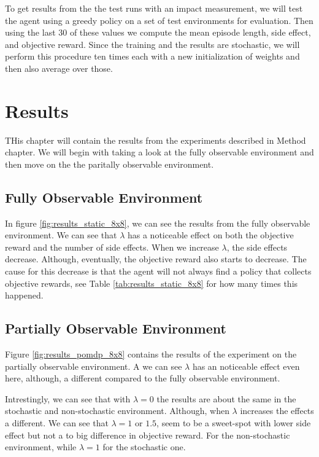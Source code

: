 \documentclass[12pt,A4]{report}
\theoremstyle{definition}
\begin{document}
To get results from the the test runs with an impact measurement, we will test the agent using a greedy policy on a set of test environments for evaluation. Then using the last 30 of these values we compute the mean episode length, side effect, and objective reward. Since the training and the results are stochastic, we will perform this procedure ten times each with a new initialization of weights and then also average over those.



\chapter{Results}
THis chapter will contain the results from the experiments described in Method chapter. We will begin with taking a look at the fully observable environment and then move on the the paritally observable environment.

\section{Fully Observable Environment}
In figure \ref{fig:results_static_8x8}, we can see the results from the fully observable environment. We can see that $\lambda$ has a noticeable effect on both the objective reward and the number of side effects. When we increase $\lambda$, the side effects decrease. Although, eventually,  the objective reward also starts to decrease. The cause for this decrease is that the agent will not always find a policy that collects objective rewards, see Table \ref{tab:results_static_8x8} for how many times this happened. 

\section{Partially Observable Environment}
Figure \ref{fig:results_pomdp_8x8} contains the results of the experiment on the partially observable environment. A we can see $\lambda$ has an noticeable effect even here, although, a different compared to the fully observable environment.

Intrestingly, we can see that with $\lambda=0$ the results are about the same in the stochastic and non-stochastic environment. Although, when $\lambda$ increases the effects a different. We can see that $\lambda= 1$ or $1.5$, seem to be a sweet-spot with lower side effect but not a to big difference in objective reward. For the non-stochastic environment, while $\lambda=1$ for the stochastic one. 
\end{document}
